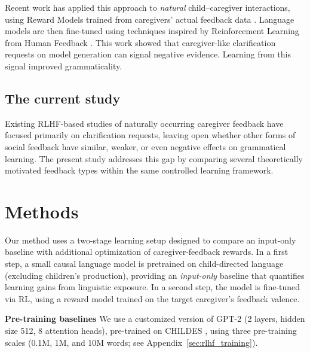 Recent work has applied this approach to \textit{natural} child--caregiver interactions, using Reward Models trained from caregivers' actual feedback data \cite{nikolaus_fourtassi_2026}. Language models are then fine-tuned using techniques inspired by Reinforcement Learning from Human Feedback \cite[RLHF,][]{ouyang_training_2022}. This work showed that caregiver-like clarification requests on model generation can signal negative evidence. Learning from this signal improved grammaticality.



\subsection*{The current study} 
Existing RLHF-based studies of naturally occurring caregiver feedback have focused primarily on clarification requests, leaving open whether other forms of social feedback have similar, weaker, or even negative effects on grammatical learning. The present study addresses this gap by comparing several theoretically motivated feedback types within the same controlled learning framework.




\section{Methods}  
\label{sec:methods}

Our method uses a two-stage learning setup designed to compare an input-only baseline with additional optimization of caregiver-feedback rewards.
In a first step, a small causal language model is pretrained on child-directed language (excluding children's production), providing an \emph{input-only} baseline that quantifies learning gains from linguistic exposure. In a second step, the model is fine-tuned via RL, using a reward model trained on the target caregiver's feedback valence. 


\noindent \textbf{Pre-training baselines}  We use a customized version of GPT-2 (2 layers, hidden size 512, 8 attention heads), pre-trained on CHILDES \citep{macwhinney2000childes}, using three pre-training scales (0.1M, 1M, and 10M words; see Appendix~\ref{sec:rlhf_training}).

